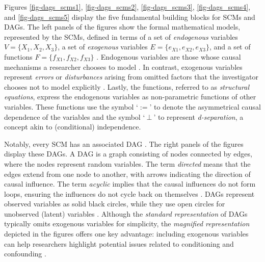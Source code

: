 \documentclass[
  authoryear,
  review,
  1p]{elsarticle}
\begin{document}
Figures \ref{fig-dags_scms1}, \ref{fig-dags_scms2},
\ref{fig-dags_scms3}, \ref{fig-dags_scms4}, and \ref{fig-dags_scms5}
display the five fundamental building blocks for SCMs and DAGs. The left
panels of the figures show the formal mathematical models, represented
by the SCMs, defined in terms of a set of \emph{endogenous} variables
\(V=\{X_{1},X_{2},X_{3}\}\), a set of \emph{exogenous} variables
\(E=\{e_{X1},e_{X2},e_{X3}\}\), and a set of functions
\(F=\{f_{X1},f_{X2},f_{X3}\}\) \citep{Pearl_2009, Cinelli_et_al_2020}.
Endogenous variables are those whose causal mechanisms a researcher
chooses to model \citep{Neal_2020}. In contrast, exogenous variables
represent \emph{errors} or \emph{disturbances} arising from omitted
factors that the investigator chooses not to model explicitly
\citep[p.~27,68]{Pearl_2009}. Lastly, the functions, referred to as
\emph{structural equations}, express the endogenous variables as
non-parametric functions of other variables. These functions use the
symbol `\(:=\)' to denote the asymmetrical causal dependence of the
variables and the symbol `\(\:\bot\:\)' to represent
\emph{d-separation}, a concept akin to (conditional) independence.

Notably, every SCM has an associated DAG
\citep{Pearl_et_al_2016, Cinelli_et_al_2020}. The right panels of the
figures display these DAGs. A DAG is a graph consisting of nodes
connected by edges, where the nodes represent random variables. The term
\emph{directed} means that the edges extend from one node to another,
with arrows indicating the direction of causal influence. The term
\emph{acyclic} implies that the causal influences do not form loops,
ensuring the influences do not cycle back on themselves
\citep{McElreath_2020}. DAGs represent observed variables as solid black
circles, while they use open circles for unobserved (latent) variables
\citep{Morgan_et_al_2014}. Although the \emph{standard representation}
of DAGs typically omits exogenous variables for simplicity, the
\emph{magnified representation} depicted in the figures offers one key
advantage: including exogenous variables can help researchers highlight
potential issues related to conditioning and confounding
\citep{Cinelli_et_al_2020}.
\end{document}
